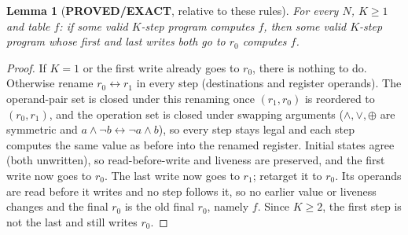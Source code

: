 \documentclass[11pt]{article}
\newtheorem*{lemma}{Lemma}
\begin{document}
\begin{lemma}[\textbf{PROVED/EXACT}, relative to these rules]
For every $N$, $K\ge1$ and table $f$: if some valid $K$-step program computes $f$, then some valid $K$-step program whose first and last writes both go to $r_0$ computes $f$.
\end{lemma}
\begin{proof}
If $K=1$ or the first write already goes to $r_0$, there is nothing to do. Otherwise rename $r_0\leftrightarrow r_1$ in every step (destinations and register operands). The operand-pair set is closed under this renaming once $(r_1,r_0)$ is reordered to $(r_0,r_1)$, and the operation set is closed under swapping arguments ($\wedge,\vee,\oplus$ are symmetric and $a\wedge\neg b\leftrightarrow\neg a\wedge b$), so every step stays legal and each step computes the same value as before into the renamed register. Initial states agree (both unwritten), so read-before-write and liveness are preserved, and the first write now goes to $r_0$. The last write now goes to $r_1$; retarget it to $r_0$. Its operands are read before it writes and no step follows it, so no earlier value or liveness changes and the final $r_0$ is the old final $r_0$, namely $f$. Since $K\ge2$, the first step is not the last and still writes $r_0$.
\end{proof}
\end{document}
